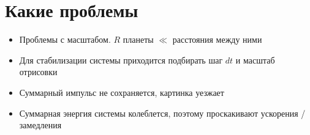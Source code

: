 \documentclass{beamer}
\begin{document}
\section{Какие проблемы}

\begin{frame}
  \begin{itemize}
    \item<1-> Проблемы с масштабом. $R$ планеты $\ll$ расстояния между ними
    \item<2-> Для стабилизации системы приходится подбирать шаг $dt$ и масштаб отрисовки
    \item<3-> Суммарный импульс не сохраняется, картинка уезжает
    \item<4-> Суммарная энергия системы колеблется, поэтому проскакивают ускорения / замедления
  \end{itemize}
\end{frame}
\end{document}

